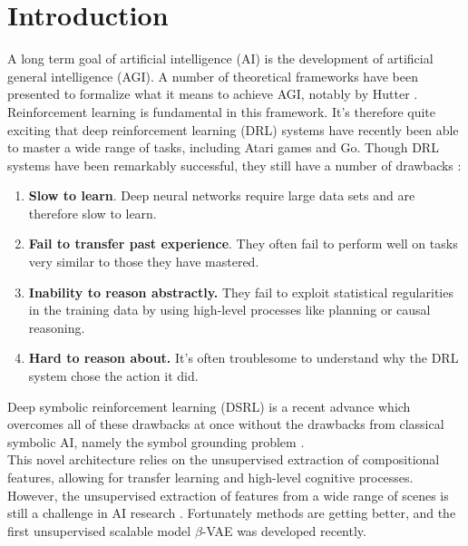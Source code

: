 \documentclass[12pt,twoside]{article}
\begin{document}


\tableofcontents
\newpage

 

\section{Introduction}
A long term goal of artificial intelligence (AI) is the development of artificial general intelligence (AGI). A number of theoretical frameworks have been presented to formalize what it means to achieve AGI, notably by Hutter \cite{Hutter2005}.\\

Reinforcement learning is fundamental in this framework. It's therefore quite exciting that deep reinforcement learning (DRL) systems have recently been able to master a wide range of tasks, including Atari games and Go. Though DRL systems have been remarkably successful, they still have a number of drawbacks \cite{Garnelo2016}:

\begin{enumerate}
\item \textbf{Slow to learn}. Deep neural networks require large data sets and are therefore slow to learn.
\item \textbf{Fail to transfer past experience}. They often fail to perform well on tasks very similar to those they have mastered.
\item \textbf{Inability to reason abstractly.} They fail to exploit statistical regularities in the training data by using high-level processes like planning or causal reasoning.
\item \textbf{Hard to reason about.} It's often troublesome to understand why the DRL system chose the action it did.
\end{enumerate}

Deep symbolic reinforcement learning (DSRL) is a recent advance which overcomes all of these drawbacks at once without the drawbacks from classical symbolic AI, namely the symbol grounding problem \cite{Garnelo2016}.\\

This novel architecture relies on the unsupervised extraction of compositional features, allowing for transfer learning and high-level cognitive processes. However, the unsupervised extraction of features from a wide range of scenes is still a challenge in AI research \cite{Bengio2013}. Fortunately methods are getting better, and the first unsupervised scalable model $\beta$-VAE was developed recently. \\
\end{document}
